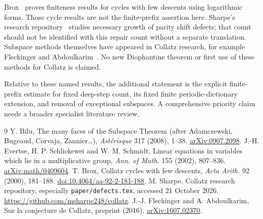 \documentclass[11pt]{article}
\begin{document}
Brox~\cite{brox} proves finiteness results for cycles with few descents using logarithmic forms. Those cycle results are not the finite-prefix assertion here. Sharpe's research repository~\cite{sharpe} studies necessary growth of parity shift defects; that count should not be identified with this repair count without a separate translation. Subspace methods themselves have appeared in Collatz research, for example Fleckinger and Abdoulkarim~\cite{fa}. No new Diophantine theorem or first use of these methods for Collatz is claimed.

Relative to these named results, the additional statement is the explicit finite-prefix estimate for fixed deep-step count, its fixed finite periodic-dictionary extension, and removal of exceptional subspaces. A comprehensive priority claim needs a broader specialist literature review.

\begin{thebibliography}{9}\small
{} Y. Bilu, The many faces of the Subspace Theorem (after Adamczewski, Bugeaud, Corvaja, Zannier\ldots), \emph{Ast\'erisque} 317 (2008), 1--38. \href{https://arxiv.org/abs/0907.2098}{arXiv:0907.2098}.
 J.-H. Evertse, H. P. Schlickewei and W. M. Schmidt, Linear equations in variables which lie in a multiplicative group, \emph{Ann. of Math.} 155 (2002), 807--836. \href{https://arxiv.org/abs/math/0409604}{arXiv:math/0409604}.
 T. Brox, Collatz cycles with few descents, \emph{Acta Arith.} 92 (2000), 181--188. \href{https://doi.org/10.4064/aa-92-2-181-188}{doi:10.4064/aa-92-2-181-188}.
 M. Sharpe, Collatz research repository, especially \texttt{paper/defects.tex}, accessed 21 October 2026. \url{https://github.com/msharpe248/collatz}.
 J.-J. Fleckinger and A. Abdoulkarim, Sur la conjecture de Collatz, preprint (2016). \href{https://arxiv.org/abs/1607.02370}{arXiv:1607.02370}.
\end{thebibliography}
\end{document}
